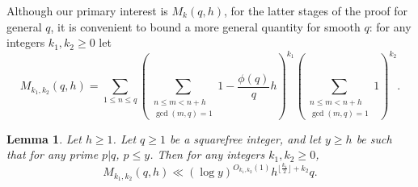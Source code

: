 \documentclass[11pt,letterpaper]{amsart}
\newcommand{\brac}[1]{\left( #1\right)}
\newcommand{\ogcd}[2]{\gcd(#1,#2)}
\newtheorem{lemma}{Lemma}
\theoremstyle{definition}
\begin{document}
Although our primary interest is $M_k(q,h)$, for the latter stages of the proof for general $q$, it is convenient to bound a more general quantity for smooth $q$: for any integers $k_1,k_2\geq 0$ let
\[M_{k_1,k_2}(q,h) = \sum_{1\leq n\leq q}\brac{\sum_{\substack{n\leq m < n+h\\ \ogcd{m}{q}=1}}1-\frac{\phi(q)}{q}h}^{k_1}\brac{\sum_{\substack{n\leq m < n+h\\ \ogcd{m}{q}=1}}1}^{k_2}.\]
\begin{lemma}\label{thm:reduced-residues-squarefree-friable-modulus}
Let $h \ge 1$. Let $q \ge 1$ be a squarefree integer, and let $y \ge h$ be such that for any prime $p|q$, $p \le y$. Then for any integers $k_1,k_2\geq 0$,
\begin{equation*}
    M_{k_1,k_2}(q,h) \ll (\log y)^{O_{k_1,k_2}(1)}h^{\lfloor \frac{k_1}{2}\rfloor+k_2}q.
\end{equation*}
\end{lemma}
\end{document}
